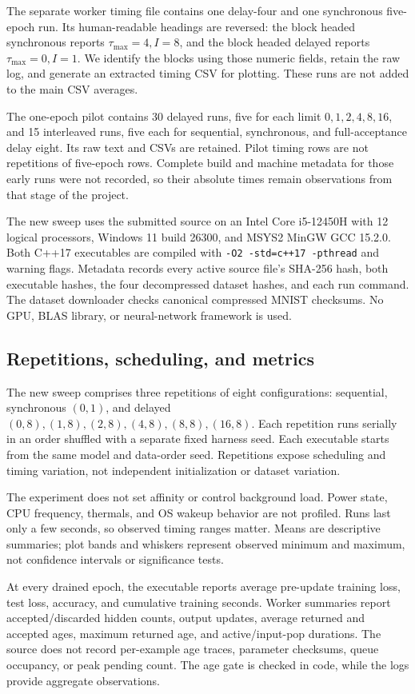 \documentclass[conference]{IEEEtran}
\newcommand{\taumax}{\tau_{\max}}
\begin{document}
The separate worker timing file contains one delay-four and one synchronous five-epoch run. Its human-readable headings are reversed: the block headed synchronous reports $\taumax=4,I=8$, and the block headed delayed reports $\taumax=0,I=1$. We identify the blocks using those numeric fields, retain the raw log, and generate an extracted timing CSV for plotting. These runs are not added to the main CSV averages.

The one-epoch pilot contains 30 delayed runs, five for each limit $0,1,2,4,8,16$, and 15 interleaved runs, five each for sequential, synchronous, and full-acceptance delay eight. Its raw text and CSVs are retained. Pilot timing rows are not repetitions of five-epoch rows. Complete build and machine metadata for those early runs were not recorded, so their absolute times remain observations from that stage of the project.

The new sweep uses the submitted source on an Intel Core i5-12450H with 12 logical processors, Windows 11 build 26300, and MSYS2 MinGW GCC 15.2.0. Both C++17 executables are compiled with \texttt{-O2 -std=c++17 -pthread} and warning flags. Metadata records every active source file's SHA-256 hash, both executable hashes, the four decompressed dataset hashes, and each run command. The dataset downloader checks canonical compressed MNIST checksums. No GPU, BLAS library, or neural-network framework is used.

\subsection{Repetitions, scheduling, and metrics}
The new sweep comprises three repetitions of eight configurations: sequential, synchronous $(0,1)$, and delayed $(0,8),(1,8),(2,8),(4,8),(8,8),(16,8)$. Each repetition runs serially in an order shuffled with a separate fixed harness seed. Each executable starts from the same model and data-order seed. Repetitions expose scheduling and timing variation, not independent initialization or dataset variation.

The experiment does not set affinity or control background load. Power state, CPU frequency, thermals, and OS wakeup behavior are not profiled. Runs last only a few seconds, so observed timing ranges matter. Means are descriptive summaries; plot bands and whiskers represent observed minimum and maximum, not confidence intervals or significance tests.

At every drained epoch, the executable reports average pre-update training loss, test loss, accuracy, and cumulative training seconds. Worker summaries report accepted/discarded hidden counts, output updates, average returned and accepted ages, maximum returned age, and active/input-pop durations. The source does not record per-example age traces, parameter checksums, queue occupancy, or peak pending count. The age gate is checked in code, while the logs provide aggregate observations.
\end{document}
